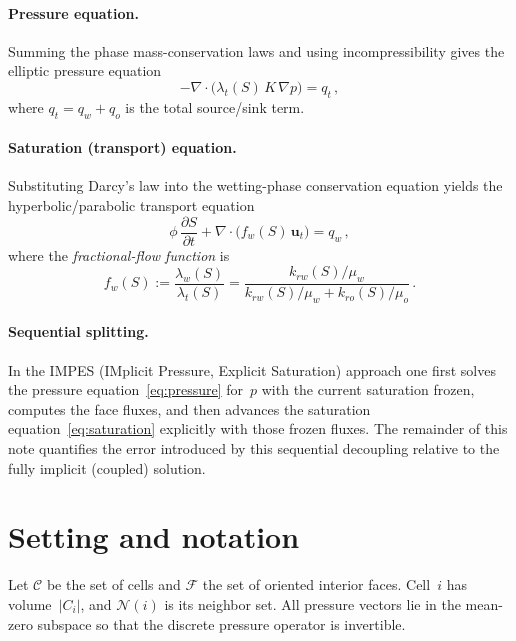 \documentclass[11pt]{article}
\begin{document}
\paragraph{Pressure equation.}
Summing the phase mass-conservation laws and using
incompressibility gives the elliptic pressure equation
\begin{equation}\label{eq:pressure}
  -\nabla\cdot\bigl(\lambda_t(S)\,K\,\nabla p\bigr) = q_t\,,
\end{equation}
where $q_t = q_w + q_o$ is the total source/sink term.

\paragraph{Saturation (transport) equation.}
Substituting Darcy's law into the wetting-phase conservation equation
yields the hyperbolic/parabolic transport equation
\begin{equation}\label{eq:saturation}
  \phi\,\frac{\partial S}{\partial t}
    + \nabla\cdot\bigl(f_w(S)\,\mathbf{u}_t\bigr)
    = q_w\,,
\end{equation}
where the \emph{fractional-flow function} is
\begin{equation}\label{eq:fw}
  f_w(S)
    := \frac{\lambda_w(S)}{\lambda_t(S)}
    = \frac{k_{rw}(S)/\mu_w}{k_{rw}(S)/\mu_w + k_{ro}(S)/\mu_o}\,.
\end{equation}

\paragraph{Sequential splitting.}
In the IMPES (IMplicit Pressure, Explicit Saturation) approach one
first solves the pressure equation~\eqref{eq:pressure} for~$p$ with
the current saturation frozen, computes the face fluxes, and then
advances the saturation equation~\eqref{eq:saturation} explicitly with
those frozen fluxes.  The remainder of this note quantifies the error
introduced by this sequential decoupling relative to the fully implicit
(coupled) solution.

\section{Setting and notation}\label{sec:notation}

Let $\mathcal{C}$ be the set of cells and $\mathcal{F}$ the set of oriented
interior faces.  Cell~$i$ has volume~$|C_i|$, and $\mathcal{N}(i)$ is its
neighbor set.  All pressure vectors lie in the mean-zero subspace so that the
discrete pressure operator is invertible.
\end{document}
